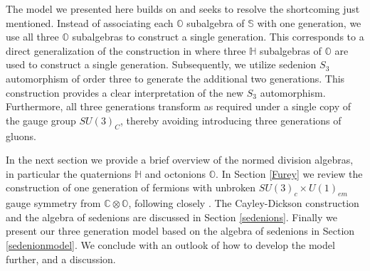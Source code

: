 \documentclass{article}
\newcommand{\bb}[1]{\mathbb{#1}}
\begin{document}

The model we presented here builds on \cite{gillard2019three} and seeks to resolve the shortcoming just mentioned.  Instead of associating each $\bb{O}$ subalgebra of $\bb{S}$ with one generation, we use all three $\bb{O}$ subalgebras to construct a single generation. This corresponds to a direct generalization of the construction in \cite{furey2016standard} where three $\bb{H}$ subalgebras of $\bb{O}$ are used to construct a single generation. Subsequently, we utilize sedenion $S_3$ automorphism of order three to generate the additional two generations. This construction provides a clear interpretation of the new $S_3$ automorphism. Furthermore, all three generations transform as required under a single copy of the gauge group $SU(3)_C$, thereby avoiding introducing three generations of gluons.


In the next section we provide a brief overview of the normed division algebras, in particular the quaternions $\bb{H}$ and octonions $\bb{O}$. In Section \ref{Furey} we review the construction of one generation of fermions with unbroken $SU(3)_c\times U(1)_{em}$ gauge symmetry from $\bb{C}\otimes\bb{O}$, following closely \cite{furey2016standard}. The Cayley-Dickson construction and the algebra of sedenions are discussed in Section \ref{sedenions}. Finally we present our three generation model based on the algebra of sedenions in Section \ref{sedenionmodel}. We conclude with an outlook of how to develop the model further, and a discussion.
\end{document}
